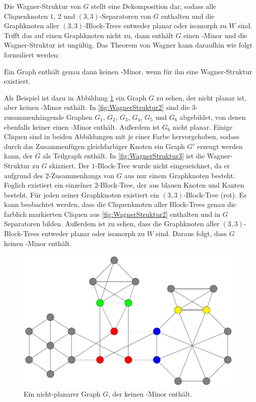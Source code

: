 Die Wagner-Struktur von $G$ stellt eine Dekomposition dar, sodass alle Cliquenknoten $1$, $2$ und $(3, 3)$-Separatoren von $G$ enthalten und die Graphknoten aller $(3, 3)$-Block-Trees entweder planar oder isomorph zu $W$ sind.
Trifft das auf einen Graphknoten nicht zu, dann enthält $G$ einen \kf-Minor und die Wagner-Struktur ist ungültig.
Das Theorem von Wagner kann daraufhin wie folgt formuliert werden:

\begin{theorem}\label{eq:TheoremWagner}
  Ein Graph enthält genau dann keinen \kf-Minor, wenn für ihn eine Wagner-Struktur existiert\cite{Wag37}.
\end{theorem}

Als Beispiel ist dazu in Abbildung \ref{fig:WagnerStruktur1} ein Graph $G$ zu sehen, der nicht planar ist, aber keinen \kf-Minor enthält.
In \Abb \ref{fig:WagnerStruktur2} sind die $3$-zusammenhängende Graphen $G_1$, $G_2$, $G_3$, $G_4$, $G_5$ und $G_6$ abgebildet, von denen ebenfalls keiner einen \kf-Minor enthält.
Außerdem ist $G_6$ nicht planar.
Einige Cliquen sind in beiden Abbildungen mit je einer Farbe hervorgehoben, sodass durch das Zusammenfügen gleichfarbiger Knoten ein Graph $G'$ erzeugt werden kann, der $G$ als Teilgraph enthält.
In \Abb \ref{fig:WagnerStruktur3} ist die Wagner-Struktur zu $G$ skizziert.
Der $1$-Block-Tree wurde nicht eingezeichnet, da er aufgrund des $2$-Zusammenhangs von $G$ aus nur einem Graphknoten besteht.
Foglich existiert ein einzelner $2$-Block-Tree, der aus blauen Knoten und Kanten besteht.
Für jeden seiner Graphknoten existiert ein $(3, 3)$-Block-Tree (rot).
Es kann beobachtet werden, dass die Cliquenknoten aller Block-Trees genau die farblich markierten Cliquen aus \Abb \ref{fig:WagnerStruktur2} enthalten und in $G$ Separatoren bilden.
Außerdem ist zu sehen, dass die Graphknoten aller $(3, 3)$-Block-Trees entweder planar oder isomorph zu $W$ sind.
Daraus folgt, dass $G$ keinen \kf-Minor enthält.

\begin{figure}[H]
  \centering
  \includegraphics[width=\textwidth,height=\textheight,keepaspectratio]{bilder/WagnerTheorem1.pdf}
  \caption{Ein nicht-planarer Graph $G$, der keinen \kf-Minor enthält.}
  \label{fig:WagnerStruktur1}
\end{figure}

